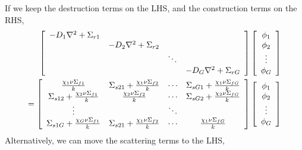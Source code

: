 \documentclass{school-22.211-notes}
\begin{document}
\clearpage
{}
If we keep the destruction terms on the LHS, and the construction terms on the RHS,
\begin{align}
\left[ \begin{array}{cccc} 
    - D_1 \nabla^2 +  \Sigma_{r1} & & & \\
    & -D_2 \nabla^2  +  \Sigma_{r2} & & \\
    & & \ddots & \\
    & & &  - D_G \nabla^2 + \Sigma_{rG}  \end{array} \right] 
\left[ \begin{array}{c} \phi_1 \\ \phi_2 \\ \vdots \\ \phi_G \end{array} \right]\\
= \left[ \begin{array}{cccc} 
\frac{\chi_1 \nu \Sigma_{f1}}{k} & \Sigma_{s21} + \frac{\chi_1 \nu \Sigma_{f2}}{k} & \cdots &  \Sigma_{sG1} + \frac{\chi_1 \nu \Sigma_{fG}}{k} \\
\Sigma_{s12} + \frac{\chi_2 \nu \Sigma_{f1}}{k} & \frac{\chi_2 \nu \Sigma_{f2}}{k} & \cdots &  \Sigma_{sG2} + \frac{\chi_2 \nu \Sigma_{fG}}{k} \\
\vdots & & \ddots &  \\
\Sigma_{s1G} + \frac{\chi_G \nu \Sigma_{f1}}{k} & \Sigma_{s21} + \frac{\chi_1 \nu \Sigma_{f2}}{k} & \cdots & \frac{\chi_1 \nu \Sigma_{fG}}{k} \\
\end{array} \right] 
\left[ \begin{array}{c} \phi_1 \\ \phi_2 \\ \vdots \\ \phi_G \end{array} \right]
\end{align}
Alternatively, we can move the scattering terms to the LHS, 
\end{document}
